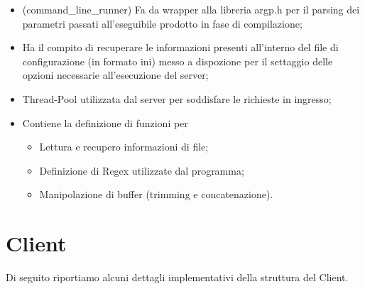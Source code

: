 \begin{minipage}{0.45\textwidth}
\begin{itemize}
        \item {} (command\_line\_runner) \rightarrow Fa da wrapper alla libreria argp.h per il parsing dei parametri passati all’eseguibile prodotto in fase di compilazione;
        \item {} \rightarrow Ha il compito di recuperare le informazioni presenti all’interno del file di configurazione (in formato ini) messo a dispozione per il settaggio delle opzioni necessarie all’esecuzione del server;
        \item {} \rightarrow Thread-Pool utilizzata dal server per soddisfare le richieste in ingresso;
        \item {} \rightarrow Contiene la definizione di funzioni per \begin{itemize} \item Lettura e recupero informazioni di file; \item Definizione di Regex utilizzate dal programma; \item Manipolazione di buffer (trimming e concatenazione). \end{itemize}
      \end{itemize}

    \end{minipage}

    \newpage
  \section{Client}
    Di seguito riportiamo alcuni dettagli implementativi della struttura del Client.

